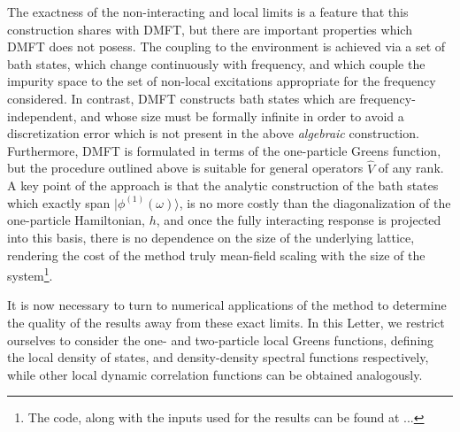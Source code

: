 \documentclass[aps,twocolumn,nobibnotes]{revtex4}
\begin{document}
The exactness of the non-interacting and local limits is a feature that this construction shares with DMFT, but there are important properties which 
DMFT does not posess. The coupling to the environment
is achieved via a set of bath states, which change continuously with frequency, and which couple the impurity space to the set of non-local excitations appropriate for the frequency considered. 
In contrast, DMFT constructs bath states which are
frequency-independent, and whose size must be formally infinite in order to avoid a discretization error which is not present in the above {\em algebraic} 
construction. Furthermore, DMFT is formulated in terms of the one-particle Greens function, but the procedure outlined above is suitable for 
general operators ${\hat V}$ of any rank. 
A key point of the approach is that the analytic construction
of the bath states which exactly span $|\phi^{(1)}(\omega) \rangle$, is no more costly than the diagonalization of the one-particle Hamiltonian, $h$, 
and once the fully interacting response is projected into this basis, there is no dependence on the size of the underlying lattice, rendering 
the cost of the method truly mean-field scaling with the size of the system\footnote{The code, along with the inputs used for the results can be found at ...}. 

It is now necessary to turn to numerical applications of the method to determine the quality of the results away from these exact limits. 
In this Letter, we restrict ourselves to consider the one- and two-particle local Greens functions,
defining the local density of states, and density-density spectral functions respectively, while other local dynamic correlation functions can be obtained analogously.
\end{document}

